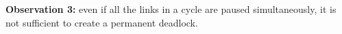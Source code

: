\textbf{Observation 3:} even if all the links in a cycle are paused simultaneously, it is not sufficient to create a permanent deadlock.

%
%
%
%
%
